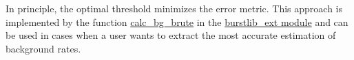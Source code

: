 In principle, the optimal threshold minimizes
the error metric. This approach is implemented by the function
\href{http://fretbursts.readthedocs.org/en/latest/plugins.html#fretbursts.burstlib\_ext.calc\_bg\_brute}{calc\_bg\_brute}
in the
\href{http://fretbursts.readthedocs.org/en/latest/plugins.html}{burstlib\_ext module} and can be used
in cases when a user wants to extract the most accurate estimation of background rates.
